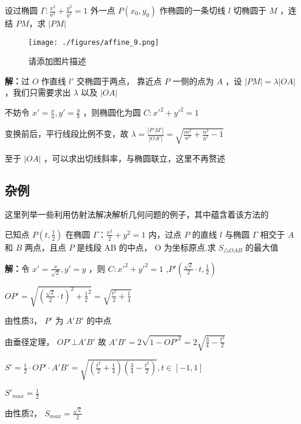 \begin{corollary}{}
设过椭圆 \(\Gamma:\frac{x^2}{a^2}+\frac{y^2}{b^2}=1\) 外一点 \(P(x_0,y_0)\) 作椭圆的一条切线 \(l\) 切椭圆于 \(M\) ，连结 \(PM\)，求 \(|PM|\)
\begin{figure}[ht]
\centering
\texttt{[image: ./figures/affine\_9.png]}
\caption{请添加图片描述} \label{affine_fig9}
\end{figure}
\textbf{解：}过 \(O\) 作直线 \(l'\) 交椭圆于两点， 靠近点 \(P\) 一侧的点为 \(A\) ，设 \(|PM|=\lambda|OA|\) ，我们只需要求出 \(\lambda\) 以及 \(|OA|\) 

不妨令 \(x'=\frac{x}{a},y'=\frac{y}{b}\) ，则椭圆化为圆 \(C:x'^2+y'^2=1\)

变换前后，平行线段比例不变，故 \(\lambda=\frac{|P'M'|}{|OA'|}=\sqrt{\frac{m^2}{a^2}+\frac{n^2}{b^2}-1}\) 

至于 \(|OA|\) ，可以求出切线斜率，与椭圆联立，这里不再赘述
\end{corollary}

\subsection{杂例}
这里列举一些利用仿射法解决解析几何问题的例子，其中蕴含着该方法的
\begin{example}{}
已知点 \(P\left(t,\frac{1}{2}\right)\) 在椭圆 \(\Gamma：\frac{x^2}{2}+y^2=1\) 内，过点 \(P\) 的直线 \(l\) 与椭圆 \(\Gamma\) 相交于 \(A\) 和 \(B\) 两点，且点 \(P\) 是线段 AB 的中点， O 为坐标原点.求 \(S_{\triangle OAB}\) 的最大值

\textbf{解：}令 \(x'=\frac{x}{\sqrt{2}},y'=y\) ，则 \(C:x'^2+y'^2=1\) ,\(P'\left(\frac{\sqrt{2}}{2}\cdot t,\frac{1}{2}\right)\)

\(OP'=\sqrt{\left(\frac{\sqrt{2}}{2}\cdot t\right)^2+{\frac{1}{2}}^2}=\sqrt{\frac{t^2}{2}+\frac{1}{4}}\)

由性质3， \(P'\) 为 \(A'B'\) 的中点

由垂径定理， \(OP'\bot A'B'\) 
故 \(A'B'=2\sqrt{1-OP'^2}=2\sqrt{\frac{3}{4}-\frac{t^2}{2}}\)

\(S'=\frac{1}{2}\cdot OP' \cdot A'B'=\sqrt{\left(\frac{t^2}{2}+\frac{1}{4}\right)\left(\frac{3}{4}-\frac{t^2}{2}\right)},t\in[-1,1]\)

\(S'_{max}=\frac{1}{2}\)

由性质2， \(S_{max}=\frac{\sqrt{2}}{2}\) 
\end{example}

